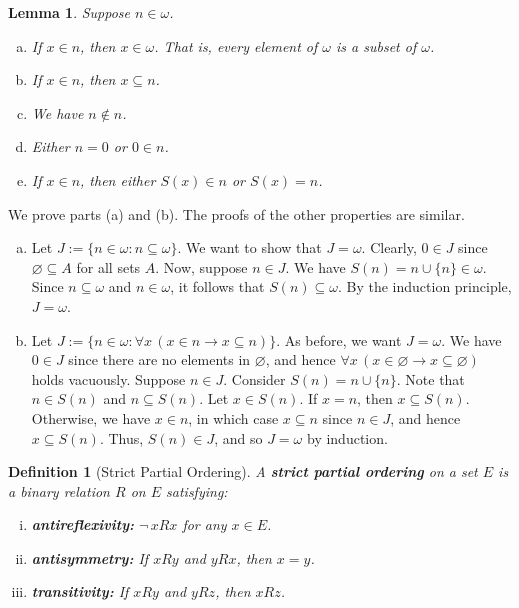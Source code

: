 \documentclass[10pt]{article}
\makeatletter
\theoremstyle{newstyle}
\newtheorem{lemma}[thm]{Lemma}
\newtheorem{defn}[thm]{Definition}
\newenvironment{pf}[1][\proofname]{\par
  \pushQED{\qed}%
  \normalfont \topsep0\p@\relax
  \trivlist
  \item[\hskip\labelsep\scshape
  #1\@addpunct{.}]\ignorespaces
}{%
  \popQED\endtrivlist\@endpefalse
}
\makeatother
\begin{document}
\begin{lemma}
Suppose $n \in \omega$. 
\begin{enumerate}[(a)]
    \item If $x \in n$, then $x \in \omega$. That is, every element of $\omega$ is a subset of 
    $\omega$. 
    \item If $x \in n$, then $x \subseteq n$. 
    \item We have $n \notin n$. 
    \item Either $n = 0$ or $0 \in n$. 
    \item If $x \in n$, then either $S(x) \in n$ or $S(x) = n$.
\end{enumerate} 
\end{lemma} 
\begin{pf}
We prove parts (a) and (b). The proofs of the other properties are similar. 
\begin{enumerate}[(a)]
    \item Let $J := \{n \in \omega : n \subseteq \omega\}$. We want to show that $J = \omega$. 
    Clearly, $0 \in J$ since $\varnothing \subseteq A$ for all sets $A$. Now, suppose $n \in J$. 
    We have $S(n) = n \cup \{n\} \in \omega$. Since $n \subseteq \omega$ and $n \in \omega$, 
    it follows that $S(n) \subseteq \omega$. By the induction principle, $J = \omega$. 
    \item Let $J := \{n \in \omega: \forall x \, (x \in n \to x \subseteq n)\}$. As before, we want 
    $J = \omega$. We have $0 \in J$ since there are no elements in $\varnothing$, and hence 
    $\forall x \, (x \in \varnothing \to x \subseteq \varnothing)$ holds vacuously. 
    Suppose $n \in J$. Consider $S(n) = n \cup \{n\}$. Note that $n \in S(n)$ and $n \subseteq S(n)$. 
    Let $x \in S(n)$. If $x = n$, then $x \subseteq S(n)$. Otherwise, we have $x \in n$, in which 
    case $x \subseteq n$ since $n \in J$, and hence $x \subseteq S(n)$. Thus, $S(n) \in J$, 
    and so $J = \omega$ by induction. \qedhere
\end{enumerate} 
\end{pf}

\begin{defn}[Strict Partial Ordering] 
A {\bf strict partial ordering} on a set $E$ is a binary relation $R$ on $E$ satisfying: 
\begin{enumerate}[(i)]
    \item {\bf antireflexivity:} $\neg \, x R x$ for any $x \in E$. 
    \item {\bf antisymmetry:} If $xRy$ and $yRx$, then $x = y$. 
    \item {\bf transitivity:} If $xRy$ and $yRz$, then $xRz$.
\end{enumerate} 
\end{defn}
\end{document}
